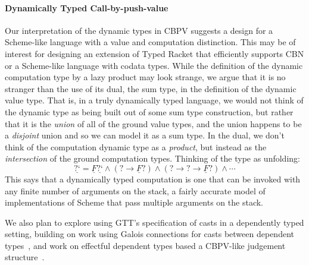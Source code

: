 \documentclass[acmsmall,nonacm]{acmart}
\newif\iflong
\renewcommand{\u}{\underline}
\newcommand{\dynv}{{?}}
\newcommand{\dync}{\u {\text{?`}}}
\begin{document}
{%

\begin{longonly}
\paragraph{Dynamically Typed Call-by-push-value}

Our interpretation of the dynamic types in CBPV suggests a design for
a Scheme-like language with a value and computation distinction.
%
This may be of interest for designing an extension of Typed Racket that
efficiently supports CBN or a Scheme-like language with codata types.
%
While the definition of the dynamic computation type by a lazy product
may look strange, we argue that it is no stranger than the use of its
dual, the sum type, in the definition of the dynamic value type.
%
That is, in a truly dynamically typed language, we would not think of
the dynamic type as being built out of some sum type construction, but
rather that it is the \emph{union} of all of the ground value types, and the
union happens to be a \emph{disjoint} union and so we can 
model it as a sum type.
%
In the dual, we don't think of the computation dynamic type as a
\emph{product}, but instead as the \emph{intersection} of the ground
computation types.
%
Thinking of the type as unfolding:
\[ \dync = \u F\dync \wedge (\dynv \to \u F \dynv) \wedge (\dynv \to \dynv \to \u F \dynv) \wedge \cdots \]
%
This says that a dynamically typed computation is one that can be
invoked with any finite number of arguments on the stack, a fairly
accurate model of implementations of Scheme that pass multiple
arguments on the stack.
\end{longonly}

\iflong
\paragraph{Dependent Contract Checking}
\fi

We also plan to explore using GTT's specification of casts in a
dependently typed setting, building on work using
Galois connections for casts between dependent
types~\cite{dagand+18interoperability}, and work on effectful dependent
types based a CBPV-like judgement
structure~\cite{ahman+16fiberedeffects}.

}
\end{document}
